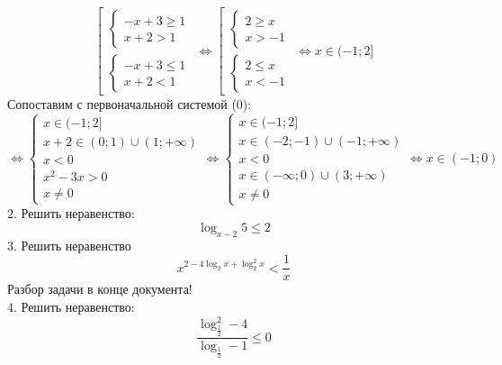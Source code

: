 \documentclass{article}
\begin{document}
\begin{equation*}
    \left[
    \begin{gathered}
      \begin{cases}
          -x + 3 \geq 1 \\
          x + 2 > 1
      \end{cases} \\
      \begin{cases}
          -x + 3 \leq 1 \\
          x + 2 < 1
      \end{cases}
    \end{gathered}
    \right.
    \Leftrightarrow
    \left[
    \begin{gathered}
      \begin{cases}
          2 \geq x \\
          x > -1
      \end{cases} \\
      \begin{cases}
          2 \leq x \\
          x < -1
      \end{cases}
    \end{gathered}
    \right.
    \Leftrightarrow
    x \in (-1;2] 
\end{equation*}
\newpage
Сопоставим с первоначальной системой (0):
\begin{equation*}
\Leftrightarrow
    \begin{cases}
    x \in (-1;2] \\
    x + 2 \in (0; 1) \cup (1;+\infty) \\
    x < 0 \\
    x^2 - 3x > 0 \\
    x \neq 0
    \end{cases}
    \Leftrightarrow
    \begin{cases}
    x \in (-1;2] \\
    x \in (-2; -1) \cup (-1;+\infty) \\
    x < 0 \\
    x \in (-\infty;0) \cup (3;+\infty) \\
    x \neq 0
    \end{cases}
    \Leftrightarrow
    x \in (-1;0)
\end{equation*}
2. Решить неравенство:
\[ \log_{x - 2} 5 \leq 2\]
3. Решить неравенство 
\[ x^{2 - 4\log_2 x + \log^2_2 x} < \frac{1}{x} \]
Разбор задачи в конце документа! \\
4. Решить неравенство:
\[ \frac{\log^2_{\frac{1}{2}} - 4}{\log_{\frac{1}{2}} - 1} \leq 0\]
\end{document}

